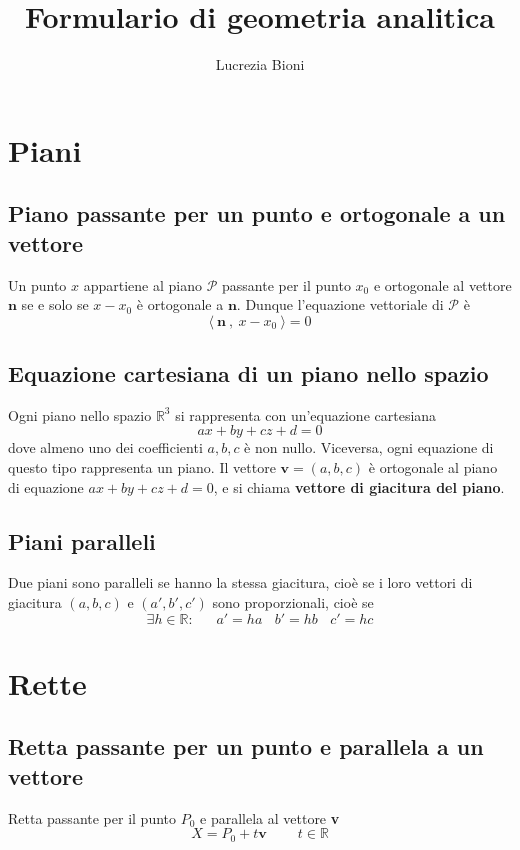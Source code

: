 \documentclass{article} %
\title{Formulario di geometria analitica} %
\author{Lucrezia Bioni} %
\date{} %
\begin{document}
    \maketitle

    \section*{Piani}

    \subsection*{Piano passante per un punto e ortogonale a un vettore} %
    Un punto $x$ appartiene al piano $\mathcal{P}$ passante per il punto $x_0$ e ortogonale al vettore $\textbf{n}$ se e solo se 
    $x-x_0$ è ortogonale a $\textbf{n}$. Dunque l'equazione vettoriale di $\mathcal{P}$ è \\
    $$
    \langle \ \textbf{n} \ , \ x-x_0  \ \rangle = 0
    $$

    \subsection*{Equazione cartesiana di un piano nello spazio} 
    Ogni piano nello spazio $\mathbb{R}^3$ si rappresenta con un'equazione cartesiana \\
    $$
    ax + by + cz + d = 0 
    $$
    dove almeno uno dei coefficienti $a, b, c$ è non nullo. Viceversa, ogni equazione di questo tipo rappresenta un piano.
    Il vettore $\textbf{v} = (a, b, c)$ è ortogonale al piano di equazione $ax + by + cz + d = 0$, e si chiama \textbf{vettore di giacitura del
    piano}. 
    
    
    \subsection*{Piani paralleli}
    Due piani sono paralleli se hanno la stessa giacitura, cioè se i loro vettori di giacitura $(a , b , c)$ e $( a' , b', c' ) $
    sono proporzionali, cioè se \\
    $$  \exists h \in \mathbb{R} : \ \ \ \ \ \ \ a' = ha \ \ \ \  b'=hb \ \ \ \ c' = hc  $$


    \section*{Rette}

    \subsection*{Retta passante per un punto e parallela a un vettore}
    Retta passante per il punto $P_0$ e parallela al vettore \textbf{v} \\
    $$
    X = P_0 + t \textbf{v} \ \ \ \ \ \ \ \ \ \    t \in \mathbb{R} 
    $$
\end{document}
